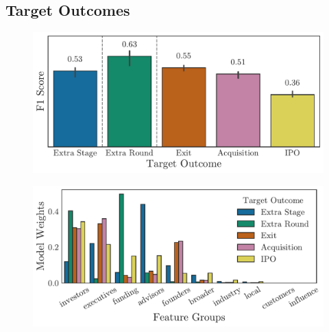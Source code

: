 \documentclass[../thesis/thesis.tex]{subfiles}
\begin{document}
\subsection{Target Outcomes}


\begin{figure}[!htb] %
    \centering
    \includegraphics[width=\textwidth]{../figures/evaluation/f1_predictive_outcome}
    \caption[F1 Scores by target outcome]{}
    \label{fig:evaluation:f1_predictive_outcome}
\end{figure}

\begin{table}[!htb] %
    \centering
    \scalebox{0.9}{}
    \caption[Classification report by target outcome]{}
    \label{fig:evaluation:clf_report_outcome}
\end{table}

\begin{figure}[!htb] %
    \centering
    \includegraphics[width=\textwidth]{../figures/evaluation/feature_groups_outcome}
    \caption[Grouped feature weights by target outcome]{}
    \label{fig:evaluation:feature_groups_outcome}
\end{figure}

\begin{table}[!htb]
    \centering
    \scalebox{0.9}{}
    \caption[Example company profiles and their predictions]{}
    \label{fig:evaluation:example_predictions}
\end{table}

\end{document}
